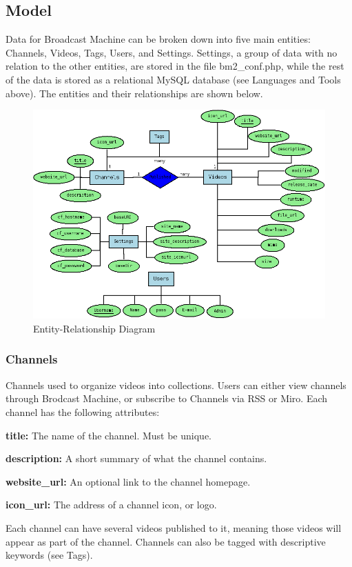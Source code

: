 \documentclass[a4paper,12pt]{report}
\begin{document}
\subsection{Model}
Data for Broadcast Machine can be broken down into five main entities: Channels, Videos, Tags, Users, and Settings. Settings, a group of data with no relation to the other entities, are stored in the file bm2\_conf.php, while the rest of the data is stored as a relational MySQL database (see Languages and Tools above). The entities and their relationships are shown below.
\begin{figure}[h]
\begin{center}
\includegraphics[scale=0.45]{./images/er.png}
\end{center}
\caption{Entity-Relationship Diagram}
\end{figure}

\subsubsection*{Channels}
Channels used to organize videos into collections. Users can either view channels through Brodcast Machine, or subscribe to Channels via RSS or Miro. Each channel has the following attributes:
\begin{description}
\item{\textbf{title: } The name of the channel. Must be unique.}
\item{\textbf{description: } A short summary of what the channel contains.}
\item{\textbf{website\_url: } An optional link to the channel homepage.}
\item{\textbf{icon\_url: } The address of a channel icon, or logo.}
\end{description}
Each channel can have several videos published to it, meaning those videos will appear as part of the channel. Channels can also be tagged with descriptive keywords (see Tags).
\end{document}
